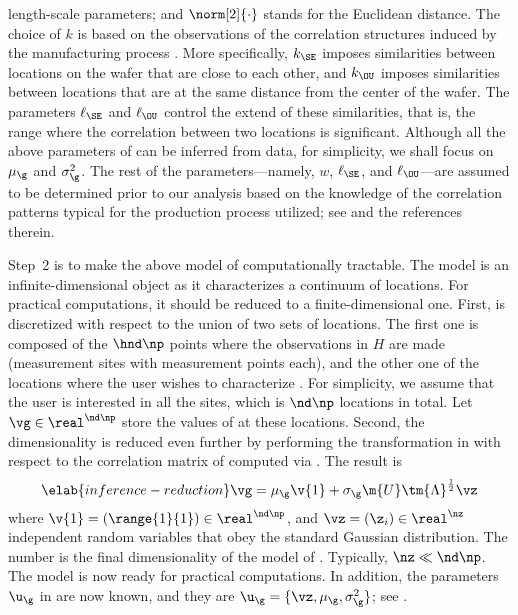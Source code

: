 length-scale parameters; and $\norm[2]{\cdot}$ stands for the Euclidean
distance. The choice of $k$ is based on the observations of the correlation
structures induced by the manufacturing process \cite{chandrakasan2000,
cheng2011}. More specifically, $k_\SE$ imposes similarities between locations on
the wafer that are close to each other, and $k_\OU$ imposes similarities between
locations that are at the same distance from the center of the wafer. The
parameters $\ell_\SE$ and $\ell_\OU$ control the extend of these similarities,
that is, the range where the correlation between two locations is significant.
Although all the above parameters of \g can be inferred from data, for
simplicity, we shall focus on $\mu_\g$ and $\sigma_\g^2$. The rest of the
parameters---namely, $w$, $\ell_\SE$, and $\ell_\OU$---are assumed to be
determined prior to our analysis based on the knowledge of the correlation
patterns typical for the production process utilized; see \cite{marzouk2009} and
the references therein.

Step~2 is to make the above model of \g computationally tractable. The model is
an infinite-dimensional object as it characterizes a continuum of locations. For
practical computations, it should be reduced to a finite-dimensional one. First,
\g is discretized with respect to the union of two sets of locations. The first
one is composed of the $\hnd \np$ points where the observations in $H$ are made
(\hnd measurement sites with \np measurement points each), and the other one of
the locations where the user wishes to characterize \g. For simplicity, we
assume that the user is interested in all the sites, which is $\nd \np$
locations in total. Let $\vg \in \real^{\nd \np}$ store the values of \g at
these locations. Second, the dimensionality is reduced even further by
performing the transformation in  with respect to
the correlation matrix of \vg computed via . The
result is
\begin{equation} \elab{inference-reduction}
  \vg = \mu_\g \v{1} + \sigma_\g \m{U} \tm{\Lambda}^\frac{1}{2} \vz
\end{equation}
where $\v{1} = (\range{1}{1}) \in \real^{\nd \np}$, and $\vz = (\z_i) \in
\real^\nz$ independent random variables that obey the standard Gaussian
distribution. The number \nz is the final dimensionality of the model of \g.
Typically, $\nz \ll \nd \np$. The model is now ready for practical computations.
In addition, the parameters $\u_\g$ in  are now known, and
they are $\u_\g = \{ \vz, \mu_\g, \sigma^2_\g \}$; see
.

